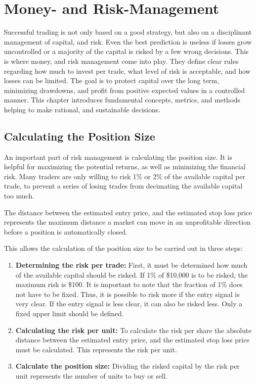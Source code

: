 \section{Money- and Risk-Management}

Successful trading is not only based on a good strategy, but also on a disciplinant management of capital, and risk. Even the best prediction is useless if losses grow uncontrolled or a majority of the capital is risked by a few wrong decisions. This is where money, and risk management come into play. They define clear rules regarding how much to invest per trade, what level of risk is acceptable, and how losses can be limited. The goal is to protect capital over the long term, minimizing drawdowns, and profit from positive expected values in a controlled manner. This chapter introduces fundamental concepts, metrics, and methods helping to make rational, and sustainable decisions.

\subsection{Calculating the Position Size}

An important part of risk management is calculating the position size. It is helpful for maximizing the potential returns, as well as minimizing the financial risk. Many traders are only willing to risk 1\% or 2\% of the available capital per trade, to prevent a series of losing trades from decimating the available capital too much.

The distance between the estimated entry price, and the estimated stop loss price represents the maximum distance a market can move in an unprofitable direction before a position is automatically closed.

This allows the calculation of the position size to be carried out in three steps:

\begin{enumerate}
    \item \textbf{Determining the risk per trade:} First, it must be determined how much of the available capital should be risked. If 1\% of \$10,000 is to be risked, the maximum risk is \$100. It is important to note that the fraction of 1\% does not have to be fixed. Thus, it is possible to risk more if the entry signal is very clear. If the entry signal is less clear, it can also be risked less. Only a fixed upper limit should be defined.
    \item \textbf{Calculating the risk per unit:} To calculate the risk per share the absolute distance between the estimated entry price, and the estimated stop loss price must be calculated. This represents the risk per unit.
    \item \textbf{Calculate the position size:} Dividing the risked capital by the risk per unit represents the number of units to buy or sell.
\end{enumerate}

